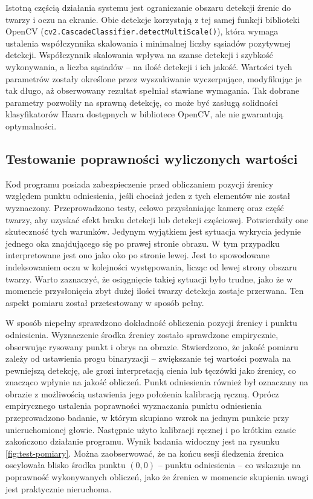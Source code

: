 \documentclass[a4paper,twoside,12pt]{book}
\begin{document}
Istotną częścią działania systemu jest ograniczanie obszaru detekcji źrenic do twarzy i oczu na ekranie. Obie detekcje korzystają z tej samej funkcji biblioteki OpenCV (\texttt{cv2.\-Cascade\-Classifier.\-detectMultiScale()}), która wymaga ustalenia współczynnika skalowania i minimalnej liczby sąsiadów pozytywnej detekcji. Współczynnik skalowania wpływa na szanse detekcji i szybkość wykonywania, a liczba sąsiadów – na ilość detekcji i ich jakość. Wartości tych parametrów zostały określone przez wyszukiwanie wyczerpujące, modyfikując je tak długo, aż obserwowany rezultat spełniał stawiane wymagania. Tak dobrane parametry pozwoliły na sprawną detekcję, co może być zasługą solidności klasyfikatorów Haara dostępnych w bibliotece OpenCV, ale nie gwarantują optymalności. 

\subsection{Testowanie poprawności wyliczonych wartości}
\label{subsec:Testowanie-wartosci}

Kod programu posiada zabezpieczenie przed obliczaniem pozycji źrenicy względem punktu odniesienia, jeśli chociaż jeden z tych elementów nie został wyznaczony. Przeprowadzono testy, celowo przysłaniając kamerę oraz część twarzy, aby uzyskać efekt braku detekcji lub detekcji częściowej. Potwierdziły one skuteczność tych warunków. Jedynym wyjątkiem jest sytuacja wykrycia jedynie jednego oka znajdującego się po prawej stronie obrazu. W tym przypadku interpretowane jest ono jako oko po stronie lewej. Jest to spowodowane indeksowaniem oczu w kolejności występowania, licząc od lewej strony obszaru twarzy. Warto zaznaczyć, że osiągnięcie takiej sytuacji było trudne, jako że w momencie przysłonięcia zbyt dużej ilości twarzy detekcja zostaje przerwana. Ten aspekt pomiaru został przetestowany w sposób pełny.

W sposób niepełny sprawdzono dokładność obliczenia pozycji źrenicy i punktu odniesienia. Wyznaczenie środka źrenicy zostało sprawdzone empirycznie, obserwując rysowany punkt i obrys na obrazie. Stwierdzono, że jakość pomiaru zależy od ustawienia progu binaryzacji -- zwiększanie tej wartości pozwala na pewniejszą detekcję, ale grozi interpretacją cienia lub tęczówki jako źrenicy, co znacząco wpłynie na jakość obliczeń. Punkt odniesienia również był oznaczany na obrazie z możliwością ustawienia jego położenia kalibracją ręczną. Oprócz empirycznego ustalenia poprawności wyznaczania punktu odniesienia przeprowadzono badanie, w którym skupiano wzrok na jednym punkcie przy unieruchomionej głowie. Następnie użyto kalibracji ręcznej i po krótkim czasie zakończono działanie programu. Wynik badania widoczny jest na rysunku \ref{fig:test-pomiary}. Można zaobserwować, że na końcu sesji śledzenia źrenica oscylowała blisko środka punktu $(0,0)$ -- punktu odniesienia -- co wskazuje na poprawność wykonywanych obliczeń, jako że źrenica w momencie skupienia uwagi jest praktycznie nieruchoma.
\end{document}
